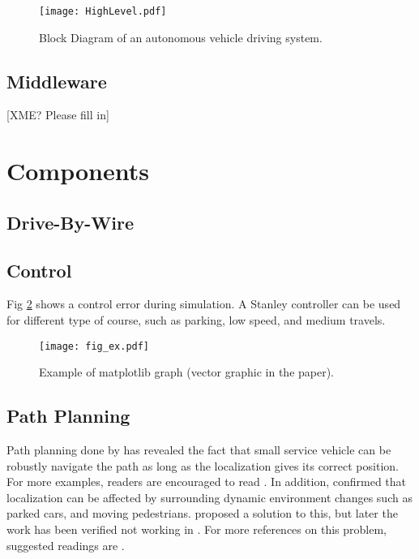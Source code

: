 \documentclass[10 pt,letterpaper,conference]{IEEEtran}
\begin{document}
\begin{figure}[!t]
\centering
\texttt{[image: HighLevel.pdf]}
\caption{Block Diagram of an autonomous vehicle driving system.}
\label{fig_1}
\end{figure}

\subsection{Middleware}\label{middleware}

{[}XME? Please fill in{]}

\section{Components}\label{components}

\subsection{Drive-By-Wire}\label{drive-by-wire}

\subsection{Control}\label{control}

Fig \ref{fig_2} shows a control error during simulation. A Stanley
controller can be used for different type of course, such as parking,
low speed, and medium travels.

\begin{figure}[!t]
\centering
\texttt{[image: fig\_ex.pdf]}
\caption{Example of matplotlib graph (vector graphic in the paper).}
\label{fig_2}
\end{figure}

\subsection{Path Planning}\label{path-planning}

Path planning done by \citeauthor{SongZW_IV_2015} has revealed the fact
that small service vehicle can be robustly navigate the path as long as
the localization gives its correct position. For more examples, readers
are encouraged to read \citep{Corley-etal_2011}. In addition,
\citet{Corley-etal_2012} confirmed that localization can be affected by
surrounding dynamic environment changes such as parked cars, and moving
pedestrians. \citet{Aalst-etal_2004} proposed a solution to this, but
later the work has been verified not working in
\citep{Abadi-etal_2008, Abebe-etal_2009}. For more references on this
problem, suggested readings are
\citep{Ackerman-Halverson_1998, Agrawal-etal_1998, Ali-etal_2012, Alipour-etal_2013}.
\end{document}
